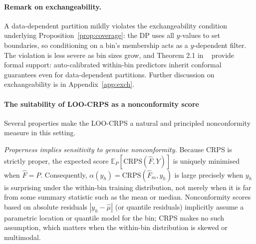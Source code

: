 \documentclass[11pt]{article}
\begin{document}
\paragraph{Remark on exchangeability.}
A data-dependent partition mildly violates the exchangeability condition underlying
Proposition~\ref{prop:coverage}: the DP uses all $y$-values to set boundaries, so
conditioning on a bin's membership acts as a $y$-dependent filter.
The violation is less severe as bin sizes grow, and Theorem 2.1 in ~\citep{AllenEtAl2025}
provide formal support: auto-calibrated within-bin predictors inherit conformal
guarantees even for data-dependent partitions.
Further discussion on exchangeability is in Appendix~\ref{app:exch}.



\paragraph{The suitability of LOO-CRPS as a nonconformity score}

Several properties make the LOO-CRPS a natural and principled nonconformity measure
in this setting.

\textit{Properness implies sensitivity to genuine nonconformity.}
Because CRPS is strictly proper, the expected score $\mathbb{E}_P[\mathrm{CRPS}(\hat{F},Y)]$
is uniquely minimised when $\hat{F} = P$.
Consequently, $\alpha(y_h) = \mathrm{CRPS}(\hat{F}_m, y_h)$ is large precisely when
$y_h$ is surprising under the within-bin training distribution, not merely when it is
far from some summary statistic such as the mean or median.
Nonconformity scores based on absolute residuals $|y_h - \hat{\mu}|$
(or quantile residuals) implicitly assume a parametric location or quantile model for the
bin; CRPS makes no such assumption, which matters when the within-bin distribution is
skewed or multimodal.
\end{document}
